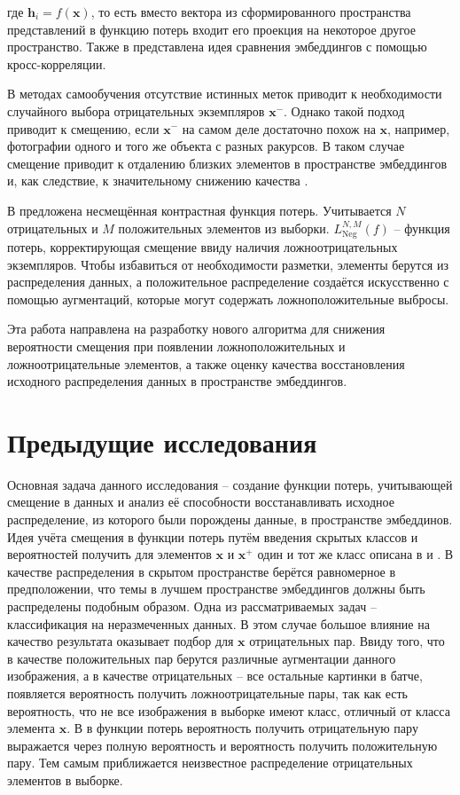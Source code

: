 \documentclass[a4paper, 14pt]{article}
\begin{document}
\noindent где $\mathbf{h}_i = f(\mathbf{x})$, то есть вместо вектора из сформированного пространства представлений в функцию потерь входит его проекция на некоторое другое пространство. Также в \citep{zbontar2021barlow} представлена идея сравнения эмбеддингов с помощью кросс-корреляции.

В методах самообучения отсутствие истинных меток приводит к необходимости случайного выбора отрицательных экземпляров $\mathbf{x}^-$. Однако такой подход приводит к смещению, если $\mathbf{x}^-$ на самом деле достаточно похож на $\mathbf{x}$, например, фотографии одного и того же объекта с разных ракурсов. В таком случае смещение приводит к отдалению близких элементов в пространстве эмбеддингов и, как следствие, к значительному снижению качества \citep{NEURIPS2021_de8aa43e}.

В \citep{chuang2020debiased} предложена несмещённая контрастная функция потерь. Учитывается $N$ отрицательных и $M$ положительных элементов из выборки. $L^{N, M}_{\text{Neg}}(f)$ -- функция потерь, корректирующая смещение ввиду наличия ложноотрицательных экземпляров. Чтобы избавиться от необходимости разметки, элементы берутся из распределения данных, а положительное распределение создаётся искусственно с помощью аугментаций, которые могут содержать ложноположительные выбросы.

Эта работа направлена на разработку нового алгоритма для снижения вероятности смещения при появлении ложноположительных и ложноотрицательные элементов, а также оценку качества восстановления исходного распределения данных в пространстве эмбеддингов.

\newpage
\section{Предыдущие исследования}
Основная задача данного исследования -- создание функции потерь, учитывающей смещение в данных и анализ её способности восстанавливать исходное распределение, из которого были порождены данные, в пространстве эмбеддинов. Идея учёта смещения в функции потерь путём введения скрытых классов и вероятностей получить для элементов $\textbf{x}$ и $\textbf{x}^+$ один и тот же класс описана в \citep{chuang2020debiased} и \citep{Arora2019ATA}. В качестве распределения в скрытом пространстве берётся равномерное в предположении, что темы в лучшем пространстве эмбеддингов должны быть распределены подобным образом. Одна из рассматриваемых задач -- классификация на неразмеченных данных. В этом случае большое влияние на качество результата оказывает подбор для $\textbf{x}$ отрицательных пар. Ввиду того, что в качестве положительных пар берутся различные аугментации данного изображения, а в качестве отрицательных -- все остальные картинки в батче, появляется вероятность получить ложноотрицательные пары, так как есть вероятность, что не все изображения в выборке имеют класс, отличный от класса элемента $\textbf{x}$. В \citep{chuang2020debiased} в функции потерь вероятность получить отрицательную пару выражается через полную вероятность и вероятность получить положительную пару. Тем самым приближается неизвестное распределение отрицательных элементов в выборке.
\end{document}
